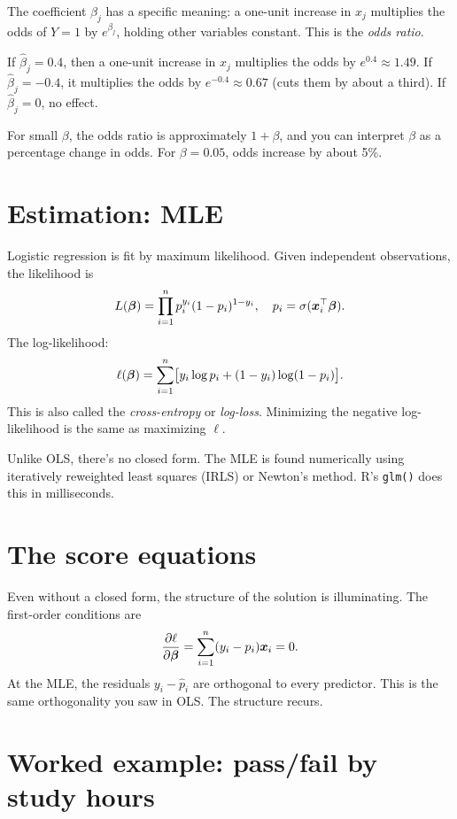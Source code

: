 The coefficient $\beta_j$ has a specific meaning: a one-unit increase in $x_j$ multiplies the odds of $Y = 1$ by $e^{\beta_j}$, holding other variables constant. This is the \emph{odds ratio}.

If $\hat\beta_j = 0.4$, then a one-unit increase in $x_j$ multiplies the odds by $e^{0.4} \approx 1.49$. If $\hat\beta_j = -0.4$, it multiplies the odds by $e^{-0.4} \approx 0.67$ (cuts them by about a third). If $\hat\beta_j = 0$, no effect.

For small $\beta$, the odds ratio is approximately $1 + \beta$, and you can interpret $\beta$ as a percentage change in odds. For $\beta = 0.05$, odds increase by about 5\%.

\section{Estimation: MLE}

Logistic regression is fit by maximum likelihood. Given independent observations, the likelihood is
\[
  L(\bm{\beta}) = \prod_{i=1}^{n} p_i^{y_i}(1 - p_i)^{1 - y_i}, \quad p_i = \sigma(\bm{x}_i^\top \bm{\beta}).
\]
The log-likelihood:
\begin{equation}
  \ell(\bm{\beta}) = \sum_{i=1}^{n} \bigl[y_i \log p_i + (1 - y_i)\log(1 - p_i)\bigr].
  \label{eq:logistic-ll}
\end{equation}
This is also called the \emph{cross-entropy} or \emph{log-loss}. Minimizing the negative log-likelihood is the same as maximizing $\ell$.

Unlike OLS, there's no closed form. The MLE is found numerically using iteratively reweighted least squares (IRLS) or Newton's method. R's \texttt{glm()} does this in milliseconds.

\section{The score equations}

Even without a closed form, the structure of the solution is illuminating. The first-order conditions are
\[
  \frac{\partial \ell}{\partial \bm{\beta}} = \sum_{i=1}^{n}(y_i - p_i)\bm{x}_i = 0.
\]
At the MLE, the residuals $y_i - \hat p_i$ are orthogonal to every predictor. This is the same orthogonality you saw in OLS. The structure recurs.

\section{Worked example: pass/fail by study hours}

